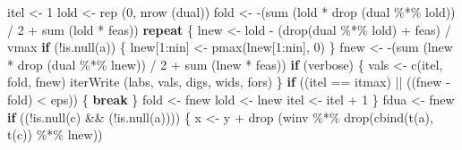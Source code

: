 \documentclass[
  12pt,
  letterpaper,
  DIV=11,
  numbers=noendperiod]{scrreprt}
\newenvironment{Shaded}{\begin{snugshade}}{\end{snugshade}}
\newcommand{\ControlFlowTok}[1]{\textcolor[rgb]{0.00,0.23,0.31}{\textbf{#1}}}
\newcommand{\DecValTok}[1]{\textcolor[rgb]{0.68,0.00,0.00}{#1}}
\newcommand{\FunctionTok}[1]{\textcolor[rgb]{0.28,0.35,0.67}{#1}}
\newcommand{\NormalTok}[1]{\textcolor[rgb]{0.00,0.23,0.31}{#1}}
\newcommand{\OtherTok}[1]{\textcolor[rgb]{0.00,0.23,0.31}{#1}}
\newcommand{\SpecialCharTok}[1]{\textcolor[rgb]{0.37,0.37,0.37}{#1}}
\theoremstyle{remark}
\begin{document}
\begin{Shaded}
\begin{Highlighting}[]
\NormalTok{    itel }\OtherTok{\textless{}{-}} \DecValTok{1}
\NormalTok{    lold }\OtherTok{\textless{}{-}} \FunctionTok{rep}\NormalTok{ (}\DecValTok{0}\NormalTok{, }\FunctionTok{nrow}\NormalTok{ (dual))}
\NormalTok{    fold }\OtherTok{\textless{}{-}}
      \SpecialCharTok{{-}}\NormalTok{(}\FunctionTok{sum}\NormalTok{ (lold }\SpecialCharTok{*} \FunctionTok{drop}\NormalTok{ (dual }\SpecialCharTok{\%*\%}\NormalTok{ lold)) }\SpecialCharTok{/} \DecValTok{2} \SpecialCharTok{+}
          \FunctionTok{sum}\NormalTok{ (lold }\SpecialCharTok{*}\NormalTok{ feas))}
    \ControlFlowTok{repeat}\NormalTok{ \{}
\NormalTok{      lnew }\OtherTok{\textless{}{-}}\NormalTok{ lold }\SpecialCharTok{{-}}\NormalTok{ (}\FunctionTok{drop}\NormalTok{(dual }\SpecialCharTok{\%*\%}\NormalTok{ lold) }\SpecialCharTok{+}\NormalTok{ feas) }\SpecialCharTok{/}\NormalTok{ vmax}
      \ControlFlowTok{if}\NormalTok{ (}\SpecialCharTok{!}\FunctionTok{is.null}\NormalTok{(a)) \{}
\NormalTok{        lnew[}\DecValTok{1}\SpecialCharTok{:}\NormalTok{nin] }\OtherTok{\textless{}{-}} \FunctionTok{pmax}\NormalTok{(lnew[}\DecValTok{1}\SpecialCharTok{:}\NormalTok{nin], }\DecValTok{0}\NormalTok{)}
\NormalTok{      \}}
\NormalTok{      fnew }\OtherTok{\textless{}{-}}
        \SpecialCharTok{{-}}\NormalTok{(}\FunctionTok{sum}\NormalTok{ (lnew }\SpecialCharTok{*} \FunctionTok{drop}\NormalTok{ (dual }\SpecialCharTok{\%*\%}\NormalTok{ lnew)) }\SpecialCharTok{/} \DecValTok{2} \SpecialCharTok{+} \FunctionTok{sum}\NormalTok{ (lnew }\SpecialCharTok{*}\NormalTok{ feas))}
      \ControlFlowTok{if}\NormalTok{ (verbose) \{}
\NormalTok{        vals }\OtherTok{\textless{}{-}} \FunctionTok{c}\NormalTok{(itel, fold, fnew)}
        \FunctionTok{iterWrite}\NormalTok{ (labs, vals, digs, wids, fors)}
\NormalTok{      \}}
      \ControlFlowTok{if}\NormalTok{ ((itel }\SpecialCharTok{==}\NormalTok{ itmax) }\SpecialCharTok{||}\NormalTok{ ((fnew }\SpecialCharTok{{-}}\NormalTok{ fold) }\SpecialCharTok{\textless{}}\NormalTok{ eps)) \{}
        \ControlFlowTok{break}
\NormalTok{      \}}
\NormalTok{      fold }\OtherTok{\textless{}{-}}\NormalTok{ fnew}
\NormalTok{      lold }\OtherTok{\textless{}{-}}\NormalTok{ lnew}
\NormalTok{      itel }\OtherTok{\textless{}{-}}\NormalTok{ itel }\SpecialCharTok{+} \DecValTok{1}
\NormalTok{    \}}
\NormalTok{    fdua }\OtherTok{\textless{}{-}}\NormalTok{ fnew}
    \ControlFlowTok{if}\NormalTok{ ((}\SpecialCharTok{!}\FunctionTok{is.null}\NormalTok{(c) }\SpecialCharTok{\&\&}\NormalTok{ (}\SpecialCharTok{!}\FunctionTok{is.null}\NormalTok{(a)))) \{}
\NormalTok{      x }\OtherTok{\textless{}{-}}\NormalTok{ y }\SpecialCharTok{+} \FunctionTok{drop}\NormalTok{ (winv }\SpecialCharTok{\%*\%} \FunctionTok{drop}\NormalTok{(}\FunctionTok{cbind}\NormalTok{(}\FunctionTok{t}\NormalTok{(a), }\FunctionTok{t}\NormalTok{(c)) }\SpecialCharTok{\%*\%}\NormalTok{ lnew))}

\end{Highlighting}
\end{Shaded}
\end{document}
